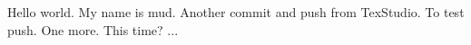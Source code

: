 Hello world.
My name is mud. 
Another commit and push from TexStudio.
To test push.
One more. 
This time? ...